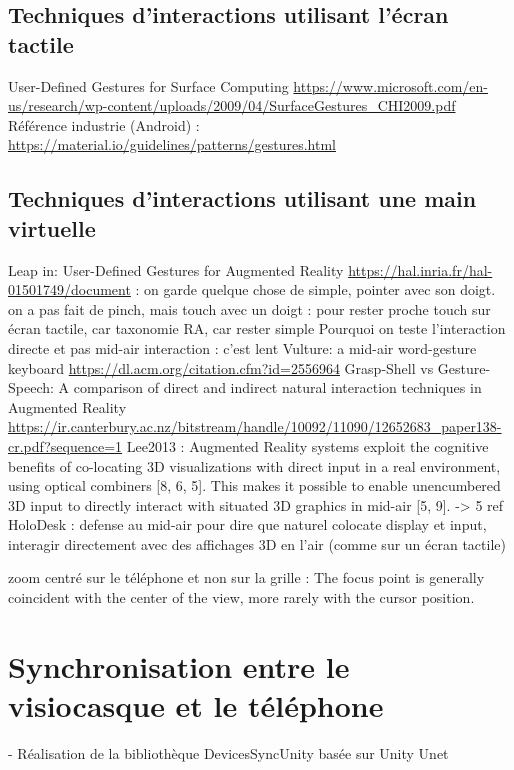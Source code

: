 \subsection{Techniques d'interactions utilisant l'écran tactile}
User-Defined Gestures for Surface Computing \url{https://www.microsoft.com/en-us/research/wp-content/uploads/2009/04/SurfaceGestures_CHI2009.pdf}
Référence industrie (Android) : \url{https://material.io/guidelines/patterns/gestures.html}

\subsection{Techniques d'interactions utilisant une main virtuelle}
Leap in:
User-Defined Gestures for Augmented Reality \url{https://hal.inria.fr/hal-01501749/document} : on garde quelque chose de simple, pointer avec son doigt. on a pas fait de pinch, mais touch avec un doigt : pour rester proche touch sur écran tactile, car taxonomie RA, car rester simple
Pourquoi on teste l'interaction directe et pas mid-air interaction : c'est lent Vulture: a mid-air word-gesture keyboard \url{https://dl.acm.org/citation.cfm?id=2556964}
Grasp-Shell vs Gesture-Speech: A comparison of direct and indirect natural interaction
techniques in Augmented Reality \url{https://ir.canterbury.ac.nz/bitstream/handle/10092/11090/12652683_paper138-cr.pdf?sequence=1}
Lee2013 : Augmented Reality systems exploit the cognitive benefits of co-locating 3D visualizations with direct input in a real environment, using optical combiners [8, 6, 5]. This makes it possible to enable unencumbered 3D input to directly interact with situated 3D graphics in mid-air [5, 9]. -> 5 ref HoloDesk : defense au mid-air pour dire que naturel colocate display et input, interagir directement avec des affichages 3D en l'air (comme sur un écran tactile)

zoom centré sur le téléphone et non sur la grille : The focus point is generally coincident with the center of the view, more rarely with the cursor position. \cite{Guiard2004}


\section{Synchronisation entre le visiocasque et le téléphone}
\label{sec:synchronization}
- Réalisation de la bibliothèque DevicesSyncUnity basée sur Unity Unet